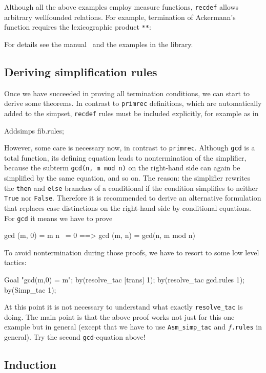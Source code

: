Although all the above examples employ measure functions, \texttt{recdef}
allows arbitrary wellfounded relations. For example, termination of
Ackermann's function requires the lexicographic product \texttt{**}:
\begin{ttbox}
\end{ttbox}
For details see the manual~\cite{isabelle-HOL} and the examples in the
library.


\subsection{Deriving simplification rules}

Once we have succeeded in proving all termination conditions, we can start to
derive some theorems. In contrast to \texttt{primrec} definitions, which are
automatically added to the simpset, \texttt{recdef} rules must be included
explicitly, for example as in
\begin{ttbox}
Addsimps fib.rules;
\end{ttbox}
However, some care is necessary now, in contrast to \texttt{primrec}.
Although \texttt{gcd} is a total function, its defining equation leads to
nontermination of the simplifier, because the subterm \texttt{gcd(n, m mod
  n)} on the right-hand side can again be simplified by the same equation,
and so on. The reason: the simplifier rewrites the \texttt{then} and
\texttt{else} branches of a conditional if the condition simplifies to
neither \texttt{True} nor \texttt{False}.  Therefore it is recommended to
derive an alternative formulation that replaces case distinctions on the
right-hand side by conditional equations. For \texttt{gcd} it means we have
to prove
\begin{ttbox}
           gcd (m, 0) = m
n ~= 0 ==> gcd (m, n) = gcd(n, m mod n)
\end{ttbox}
To avoid nontermination during those proofs, we have to resort to some low
level tactics:
\begin{ttbox}
Goal "gcd(m,0) = m";
by(resolve_tac [trans] 1);
by(resolve_tac gcd.rules 1);
by(Simp_tac 1);
\end{ttbox}
At this point it is not necessary to understand what exactly
\texttt{resolve_tac} is doing. The main point is that the above proof works
not just for this one example but in general (except that we have to use
\texttt{Asm_simp_tac} and $f$\texttt{.rules} in general). Try the second
\texttt{gcd}-equation above!


\subsection{Induction}

